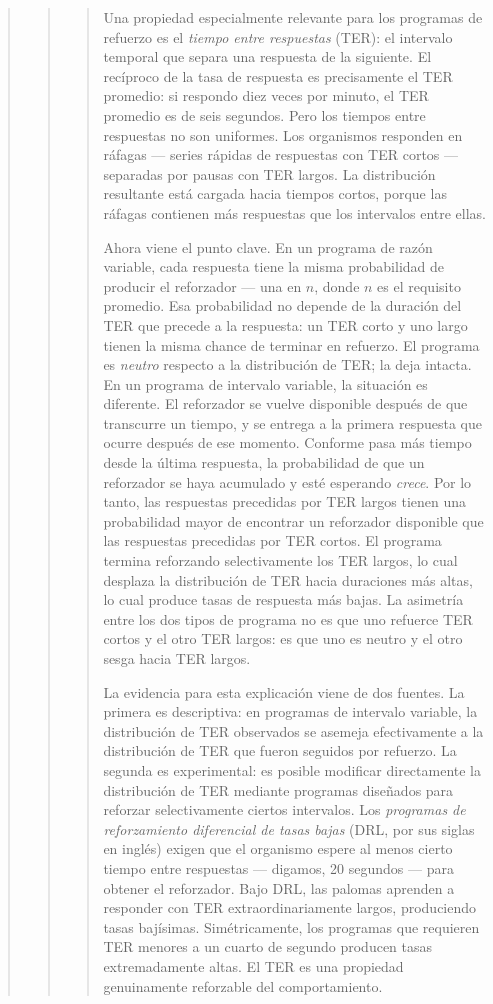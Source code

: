 \documentclass[
  letterpaper,
  DIV=11,
  numbers=noendperiod]{scrreprt}
\begin{document}
\begin{tcolorbox}[enhanced jigsaw, toprule=.15mm, arc=.35mm, colback=white, opacityback=0, colframe=quarto-callout-note-color-frame, breakable, rightrule=.15mm, left=2mm, leftrule=.75mm, bottomrule=.15mm]
\begin{quote}
\begin{quote}
\begin{quote}
Una propiedad especialmente relevante para los programas de refuerzo es
el \emph{tiempo entre respuestas} (TER): el intervalo temporal que
separa una respuesta de la siguiente. El recíproco de la tasa de
respuesta es precisamente el TER promedio: si respondo diez veces por
minuto, el TER promedio es de seis segundos. Pero los tiempos entre
respuestas no son uniformes. Los organismos responden en ráfagas ---
series rápidas de respuestas con TER cortos --- separadas por pausas con
TER largos. La distribución resultante está cargada hacia tiempos
cortos, porque las ráfagas contienen más respuestas que los intervalos
entre ellas.

Ahora viene el punto clave. En un programa de razón variable, cada
respuesta tiene la misma probabilidad de producir el reforzador --- una
en \(n\), donde \(n\) es el requisito promedio. Esa probabilidad no
depende de la duración del TER que precede a la respuesta: un TER corto
y uno largo tienen la misma chance de terminar en refuerzo. El programa
es \emph{neutro} respecto a la distribución de TER; la deja intacta. En
un programa de intervalo variable, la situación es diferente. El
reforzador se vuelve disponible después de que transcurre un tiempo, y
se entrega a la primera respuesta que ocurre después de ese momento.
Conforme pasa más tiempo desde la última respuesta, la probabilidad de
que un reforzador se haya acumulado y esté esperando \emph{crece}. Por
lo tanto, las respuestas precedidas por TER largos tienen una
probabilidad mayor de encontrar un reforzador disponible que las
respuestas precedidas por TER cortos. El programa termina reforzando
selectivamente los TER largos, lo cual desplaza la distribución de TER
hacia duraciones más altas, lo cual produce tasas de respuesta más
bajas. La asimetría entre los dos tipos de programa no es que uno
refuerce TER cortos y el otro TER largos: es que uno es neutro y el otro
sesga hacia TER largos.

La evidencia para esta explicación viene de dos fuentes. La primera es
descriptiva: en programas de intervalo variable, la distribución de TER
observados se asemeja efectivamente a la distribución de TER que fueron
seguidos por refuerzo. La segunda es experimental: es posible modificar
directamente la distribución de TER mediante programas diseñados para
reforzar selectivamente ciertos intervalos. Los \emph{programas de
reforzamiento diferencial de tasas bajas} (DRL, por sus siglas en
inglés) exigen que el organismo espere al menos cierto tiempo entre
respuestas --- digamos, 20 segundos --- para obtener el reforzador. Bajo
DRL, las palomas aprenden a responder con TER extraordinariamente
largos, produciendo tasas bajísimas. Simétricamente, los programas que
requieren TER menores a un cuarto de segundo producen tasas
extremadamente altas. El TER es una propiedad genuinamente reforzable
del comportamiento.


\end{quote}
\end{quote}
\end{quote}
\end{tcolorbox}
\end{document}
